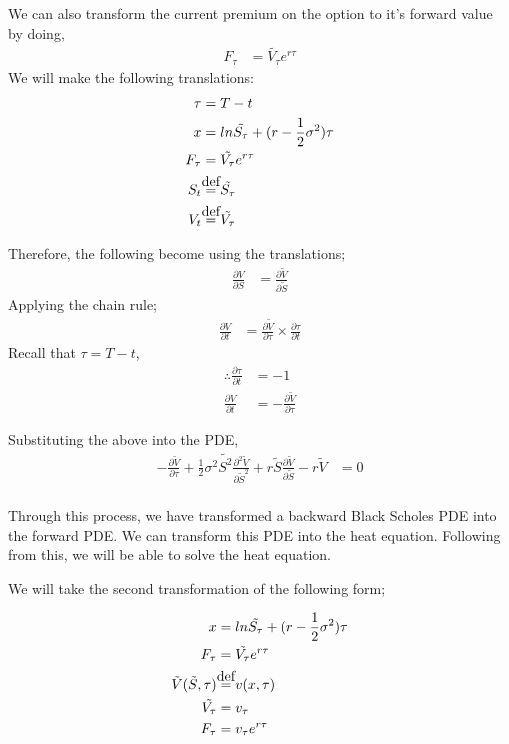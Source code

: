 \documentclass[12pt]{article}
\newcommand\myeq{\stackrel{\mathclap{\normalfont\mbox{def}}}{=}}
\begin{document}
We can also transform the current premium on the option to it's forward value by doing,
\begin{align*}
F_{\tau} &= \tilde{V_{\tau}}e^{r\tau}
\end{align*}
We will make the following translations:
\begin{align*}
\tau &= T - t \\
x &= ln{\tilde{S_{\tau}}} + (r-\frac{1}{2}\sigma ^2)\tau \\
F_{\tau} &= \tilde{V_{\tau}}e^{r\tau} \\
S_{t} &\myeq \tilde{S_{\tau}} \\
V_{t} &\myeq \tilde{V_{\tau}} \\
\end{align*}

Therefore, the following become using the translations;
\begin{align*}
\frac{\partial V}{\partial S} &= \frac{\partial \tilde{V}}{\partial \tilde{S}}
\end{align*}
Applying the chain rule;
\begin{align*}
\frac{\partial V}{\partial t} &= \frac{\partial \tilde{V}}{\partial \tau} \times \frac{\partial \tau}{\partial t} 
\end{align*}
Recall that $\tau = T - t$,
\begin{align*}
\therefore \frac{\partial \tau}{\partial t} &= -1 \\
\frac{\partial V}{\partial t} &= -\frac{\partial \tilde{V}}{\partial \tau}
\end{align*}

Substituting the above into the PDE,
\begin{align*}
-\frac{\partial \tilde{V}}{\partial \tau} + \frac{1}{2}\sigma^2 \tilde{S^2}\frac{\partial ^2 \tilde{V}}{\partial \tilde{S}^2} + r \tilde{S}\frac{\partial\tilde{V}}{\partial \tilde{S}} - r\tilde{V} &= 0 \\
\end{align*}

Through this process, we have transformed a backward Black Scholes PDE into the forward PDE. We can transform this PDE into the heat equation. Following from this, we will be able to solve the heat equation.

We will take the second transformation of the following form;

\begin{align*}
x &= ln{\tilde{S_{\tau}}} + (r - \frac{1}{2}\sigma ^2)\tau \\
F_{\tau} &= \tilde{V_{\tau}}e^{r\tau} \\
\tilde{V}(\tilde{S}, \tau) &\myeq v(x, \tau) \\
\tilde{V_{\tau}} &= v_{\tau} \\
F_{\tau} &= v_{\tau}e^{r\tau} \\
\end{align*}
\end{document}

